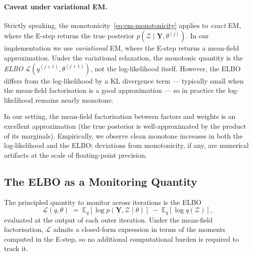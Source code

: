 \documentclass[11pt, a4paper, oneside]{article}
\begin{document}
\paragraph{Caveat under variational EM.}
Strictly speaking, the monotonicity~\eqref{eq:em-monotonicity} applies
to \emph{exact} EM, where the E-step returns the true posterior
$p(\mathcal{Z} \mid \mathbf{Y}, \theta^{(j)})$. In our implementation
we use \emph{variational} EM, where
the E-step returns a mean-field approximation. Under the variational
relaxation, the monotonic quantity is the \emph{ELBO}
$\mathcal{L}(q^{(j+1)}, \theta^{(j+1)})$, not the log-likelihood
itself. However, the ELBO differs from the log-likelihood by a KL
divergence term — typically small when the mean-field factorisation
is a good approximation — so in practice the log-likelihood remains
nearly monotone.

In our setting, the mean-field factorisation between factors and
weights is an excellent approximation (the true posterior is
well-approximated by the product of its marginals). Empirically, we
observe clean monotone increases in both the log-likelihood and the
ELBO; deviations from monotonicity, if any, are numerical artifacts
at the scale of floating-point precision.

\subsection{The ELBO as a Monitoring Quantity}
\label{subsec:elbo-monitoring}

The principled quantity to monitor across iterations is the ELBO
\begin{equation}
\mathcal{L}(q, \theta) \;=\; \mathbb{E}_q[\log p(\mathbf{Y}, \mathcal{Z} \mid \theta)] \;-\; \mathbb{E}_q[\log q(\mathcal{Z})],
\label{eq:elbo-definition}
\end{equation}
evaluated at the output of each outer iteration. Under the
mean-field factorisation, $\mathcal{L}$ admits a closed-form
expression in terms of the moments computed in the E-step, so no
additional computational burden is required to track it.
\end{document}
